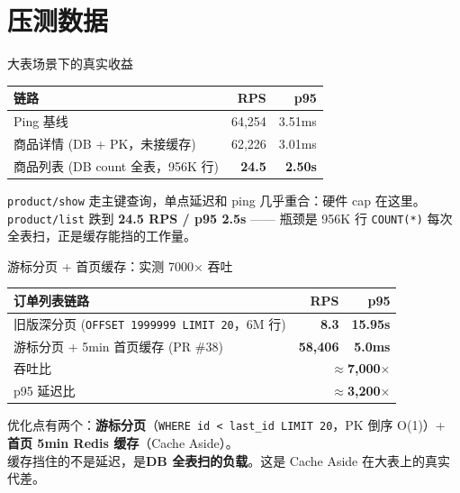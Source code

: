\section{压测数据}

\begin{frame}{大表场景下的真实收益}
\begin{tabular}{@{}lrr@{}}
\toprule
链路 & RPS & p95 \\
\midrule
Ping 基线 & 64{,}254 & 3.51ms \\
商品详情 (DB + PK，未接缓存) & 62{,}226 & 3.01ms \\
商品列表 (DB count 全表，956K 行) & \textbf{24.5} & \textbf{2.50s} \\
\bottomrule
\end{tabular}

\vspace{2mm}
\small \texttt{product/show} 走主键查询，单点延迟和 ping 几乎重合：硬件 cap 在这里。\\
\texttt{product/list} 跌到 \textbf{24.5 RPS / p95 2.5s} —— 瓶颈是 956K 行 \texttt{COUNT(*)} 每次全表扫，正是缓存能挡的工作量。
\end{frame}

\begin{frame}{游标分页 + 首页缓存：实测 7000$\times$ 吞吐}
\begin{tabular}{@{}lrr@{}}
\toprule
订单列表链路 & RPS & p95 \\
\midrule
旧版深分页 (\texttt{OFFSET 1999999 LIMIT 20}，6M 行) & \textbf{8.3} & \textbf{15.95s} \\
游标分页 + 5min 首页缓存 (PR \#38) & \textbf{58{,}406} & \textbf{5.0ms} \\
\midrule
吞吐比 & \multicolumn{2}{r}{\textbf{$\approx$7{,}000$\times$}} \\
p95 延迟比 & \multicolumn{2}{r}{\textbf{$\approx$3{,}200$\times$}} \\
\bottomrule
\end{tabular}

\vspace{2mm}
\small 优化点有两个：\textbf{游标分页}（\texttt{WHERE id < last\_id LIMIT 20}，PK 倒序 O(1)）+ \textbf{首页 5min Redis 缓存}（Cache Aside）。\\
缓存挡住的不是延迟，是\textbf{DB 全表扫的负载}。这是 Cache Aside 在大表上的真实代差。
\end{frame}

